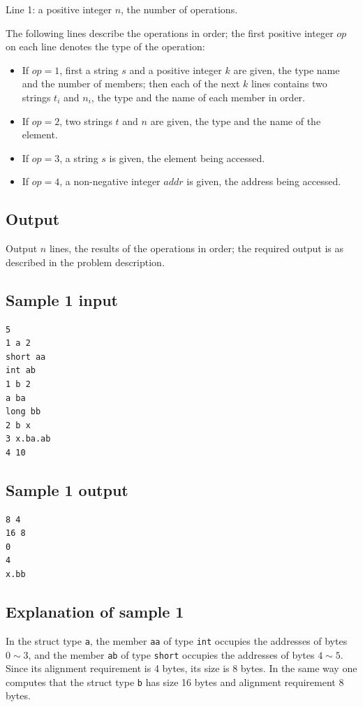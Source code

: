 \documentclass[11pt]{article}
\begin{document}
Line 1: a positive integer $n$, the number of operations.

The following lines describe the operations in order; the first positive
integer $op$ on each line denotes the type of the operation:
\begin{itemize}
\item If $op = 1$, first a string $s$ and a positive integer $k$ are
  given, the type name and the number of members; then each of the next
  $k$ lines contains two strings $t_i$ and $n_i$, the type and the name
  of each member in order.
\item If $op = 2$, two strings $t$ and $n$ are given, the type and the
  name of the element.
\item If $op = 3$, a string $s$ is given, the element being accessed.
\item If $op = 4$, a non-negative integer $addr$ is given, the address
  being accessed.
\end{itemize}

\subsection*{Output}

Output $n$ lines, the results of the operations in order; the required
output is as described in the problem description.

\subsection*{Sample 1 input}

\begin{verbatim}
5
1 a 2
short aa
int ab
1 b 2
a ba
long bb
2 b x
3 x.ba.ab
4 10
\end{verbatim}

\subsection*{Sample 1 output}

\begin{verbatim}
8 4
16 8
0
4
x.bb
\end{verbatim}

\subsection*{Explanation of sample 1}

In the struct type \texttt{a}, the member \texttt{aa} of type
\texttt{int} occupies the addresses of bytes $0 \sim 3$, and the member
\texttt{ab} of type \texttt{short} occupies the addresses of bytes
$4 \sim 5$.
Since its alignment requirement is 4 bytes, its size is 8 bytes.
In the same way one computes that the struct type \texttt{b} has size
16 bytes and alignment requirement 8 bytes.
\end{document}
